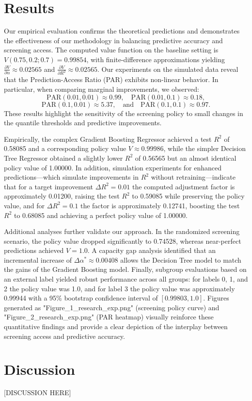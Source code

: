\documentclass[11pt]{article}
\begin{document}
\section{Results}
Our empirical evaluation confirms the theoretical predictions and demonstrates the effectiveness of our methodology in balancing predictive accuracy and screening access. The computed value function on the baseline setting is \(V(0.75, 0.2; 0.7) = 0.99854\), with finite-difference approximations yielding \(\frac{\partial V}{\partial \alpha} \approx 0.02565\) and \(\frac{\partial V}{\partial R^2} \approx 0.02565\). Our experiments on the simulated data reveal that the Prediction-Access Ratio (PAR) exhibits non-linear behavior. In particular, when comparing marginal improvements, we observed:
\[
\text{PAR}(0.01, 0.01) \approx 0.99,\quad \text{PAR}(0.01, 0.1) \approx 0.18,
\]
\[
\text{PAR}(0.1, 0.01) \approx 5.37,\quad \text{and}\quad \text{PAR}(0.1, 0.1) \approx 0.97.
\]
These results highlight the sensitivity of the screening policy to small changes in the quantile thresholds and predictive improvements.

Empirically, the complex Gradient Boosting Regressor achieved a test \(R^2\) of 0.58085 and a corresponding policy value \(V \approx 0.99986\), while the simpler Decision Tree Regressor obtained a slightly lower \(R^2\) of 0.56565 but an almost identical policy value of 1.00000. In addition, simulation experiments for enhanced predictions—which simulate improvements in \(R^2\) without retraining—indicate that for a target improvement \(\Delta R^2 = 0.01\) the computed adjustment factor is approximately 0.01200, raising the test \(R^2\) to 0.59085 while preserving the policy value, and for \(\Delta R^2 = 0.1\) the factor is approximately 0.12741, boosting the test \(R^2\) to 0.68085 and achieving a perfect policy value of 1.00000.

Additional analyses further validate our approach. In the randomized screening scenario, the policy value dropped significantly to 0.74528, whereas near-perfect predictions achieved \(V = 1.0\). A capacity gap analysis identified that an incremental increase of \(\Delta \alpha^* \approx 0.00408\) allows the Decision Tree model to match the gains of the Gradient Boosting model. Finally, subgroup evaluations based on an external label yielded robust performance across all groups: for labels 0, 1, and 2 the policy value was 1.0, and for label 3 the policy value was approximately 0.99944 with a 95\% bootstrap confidence interval of \([0.99803, 1.0]\). Figures generated as "Figure\_1\_research\_exp.png" (screening policy curve) and "Figure\_2\_research\_exp.png" (PAR heatmap) visually reinforce these quantitative findings and provide a clear depiction of the interplay between screening access and predictive accuracy.

\section{Discussion}
[DISCUSSION HERE]
\end{document}

